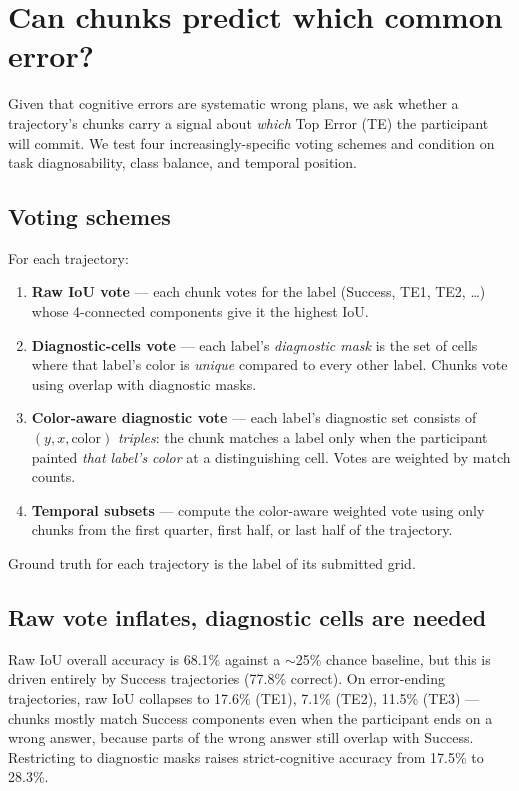 \documentclass[11pt]{article}
\begin{document}
\section{Can chunks predict which common error?}
\label{sec:errors}

Given that cognitive errors are systematic wrong plans, we ask
whether a trajectory's chunks carry a signal about \emph{which}
Top Error (TE) the participant will commit. We test four
increasingly-specific voting schemes and condition on task
diagnosability, class balance, and temporal position.

\subsection{Voting schemes}

For each trajectory:

\begin{enumerate}[leftmargin=*, topsep=2pt, itemsep=1pt]
  \item \textbf{Raw IoU vote} --- each chunk votes for the label
        (Success, TE1, TE2, \ldots) whose 4-connected components
        give it the highest IoU.
  \item \textbf{Diagnostic-cells vote} --- each label's
        \emph{diagnostic mask} is the set of cells where that
        label's color is \emph{unique} compared to every other
        label. Chunks vote using overlap with diagnostic masks.
  \item \textbf{Color-aware diagnostic vote} --- each label's
        diagnostic set consists of $(y, x, \text{color})$
        \emph{triples}: the chunk matches a label only when the
        participant painted \emph{that label's color} at a
        distinguishing cell. Votes are weighted by match counts.
  \item \textbf{Temporal subsets} --- compute the color-aware
        weighted vote using only chunks from the first quarter,
        first half, or last half of the trajectory.
\end{enumerate}

Ground truth for each trajectory is the label of its submitted
grid.

\subsection{Raw vote inflates, diagnostic cells are needed}

Raw IoU overall accuracy is 68.1\% against a $\sim$25\% chance
baseline, but this is driven entirely by Success trajectories
(77.8\% correct). On error-ending trajectories, raw IoU collapses
to 17.6\% (TE1), 7.1\% (TE2), 11.5\% (TE3) --- chunks mostly match
Success components even when the participant ends on a wrong
answer, because parts of the wrong answer still overlap with Success.
Restricting to diagnostic masks raises strict-cognitive accuracy
from 17.5\% to 28.3\%.
\end{document}

